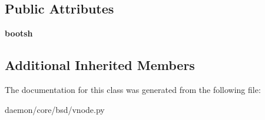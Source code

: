 \subsection*{Public Attributes}
\begin{DoxyCompactItemize}
\item 
\hypertarget{classcore_1_1bsd_1_1vnode_1_1_jail_node_a41178993946ed2b40518c2712565aaa3}{{\bfseries bootsh}}\label{classcore_1_1bsd_1_1vnode_1_1_jail_node_a41178993946ed2b40518c2712565aaa3}

\end{DoxyCompactItemize}
\subsection*{Additional Inherited Members}


The documentation for this class was generated from the following file\+:\begin{DoxyCompactItemize}
\item 
daemon/core/bsd/vnode.\+py\end{DoxyCompactItemize}

